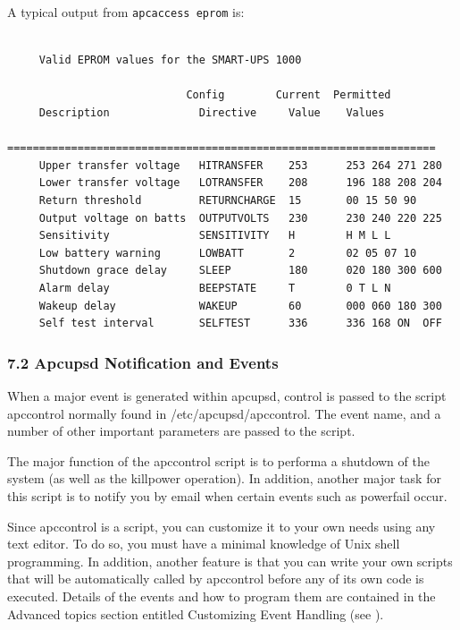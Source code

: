 A typical output from {\tt apcaccess eprom} is: 

\footnotesize
\begin{verbatim}
     
     Valid EPROM values for the SMART-UPS 1000
     
                            Config        Current  Permitted
     Description              Directive     Value    Values
     ===================================================================
     Upper transfer voltage   HITRANSFER    253      253 264 271 280
     Lower transfer voltage   LOTRANSFER    208      196 188 208 204
     Return threshold         RETURNCHARGE  15       00 15 50 90
     Output voltage on batts  OUTPUTVOLTS   230      230 240 220 225
     Sensitivity              SENSITIVITY   H        H M L L
     Low battery warning      LOWBATT       2        02 05 07 10
     Shutdown grace delay     SLEEP         180      020 180 300 600
     Alarm delay              BEEPSTATE     T        0 T L N
     Wakeup delay             WAKEUP        60       000 060 180 300
     Self test interval       SELFTEST      336      336 168 ON  OFF
\end{verbatim}
\normalsize

\label{Apcupsd-Notification-and-Events}

\subsubsection*{7.2 Apcupsd Notification and Events}

\label{index-Notification-116}
\label{index-Events-117}
When a major event is generated within apcupsd, control is passed to the
script apccontrol normally found in /etc/apcupsd/apccontrol. The event name,
and a number of other important parameters are passed to the script.  

The major function of the apccontrol script is to performa a shutdown of the
system (as well as the killpower operation). In addition, another major task
for this script is to notify you by email when certain events such as
powerfail occur.  

Since apccontrol is a script, you can customize it to your own needs using any
text editor. To do so, you must have a minimal knowledge of Unix shell
programming. In addition, another feature is that you can write your own
scripts that will be automatically called by apccontrol before any of its own
code is executed. Details of the events and how to program them are contained
in the Advanced topics section entitled Customizing Event Handling (see 
). 

